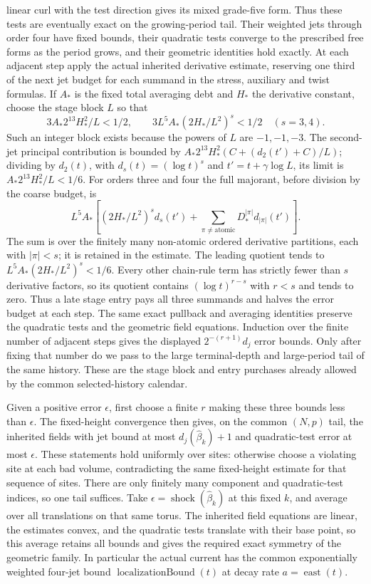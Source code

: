 linear curl with the test direction gives its mixed grade-five form.
Thus these tests are eventually exact on the growing-period tail.
Their
weighted jets through order four have fixed bounds, their
quadratic tests converge to the prescribed free forms as the period
grows, and their geometric identities hold exactly. At each adjacent
step apply the actual inherited derivative estimate, reserving one
third of the next jet budget for each summand in the stress, auxiliary
and twist formulas. If $A_*$ is the fixed total averaging debt and
$H_*$ the derivative constant, choose the stage block $L$ so that
\[
 3A_*2^{13}H_*^2/L<1/2,\qquad
 3L^5A_*(2H_*/L^2)^s<1/2\quad(s=3,4).
\]
Such an integer block exists because the powers of $L$ are $-1,-1,-3$.
The second-jet principal contribution is bounded by
$A_*2^{13}H_*^2(C+(d_2(t')+C)/L)$; dividing by $d_2(t)$,
with $d_s(t)=(\log t)^s$ and $t'=t+\gamma\log L$, its limit is
$A_*2^{13}H_*^2/L<1/6$.
For orders three and four the full majorant, before division by the
coarse budget, is
\[
 L^5A_*\left[(2H_*/L^2)^s d_s(t')+
   \sum_{\pi\ne\mathrm{atomic}}D_*^{|\pi|}d_{|\pi|}(t')\right].
\]
The sum is over the finitely many non-atomic ordered derivative
partitions, each with $|\pi|<s$; it is retained in the estimate.
The leading quotient tends to
$L^5A_*(2H_*/L^2)^s<1/6$. Every other chain-rule term has
strictly fewer than $s$ derivative factors, so its quotient contains
$(\log t)^{r-s}$ with $r<s$ and tends to zero. Thus a late stage
entry pays all three summands and halves the error budget at each
step. The same exact pullback and averaging identities preserve the
quadratic tests and the geometric field equations. Induction over the
finite number of adjacent steps gives the displayed
$2^{-(r+1)}d_j$ error bounds. Only after fixing that number do we
pass to the large terminal-depth and large-period tail of the same
history. These are the stage block and entry purchases already allowed
by the common selected-history calendar.

Given a positive error $\epsilon$, first choose a finite $r$ making
these three bounds less than $\epsilon$. The fixed-height convergence
then gives, on the common $(N,p)$ tail, the inherited fields with jet
bound at most $d_j(\widehat\beta_k)+1$ and quadratic-test error at
most $\epsilon$. These statements hold uniformly over sites: otherwise
choose a violating site at each bad volume, contradicting the same
fixed-height estimate for that sequence of sites. There are only
finitely many component and quadratic-test indices, so one tail suffices.
Take $\epsilon=\operatorname{shock}(\widehat\beta_k)$ at this fixed
$k$, and average over all translations on that same torus.
The inherited field equations are linear, the estimates convex,
and the quadratic tests translate with their base point, so this average retains all bounds
and gives the required exact symmetry of the geometric family.
In particular the actual current has the common exponentially weighted
four-jet bound $\operatorname{localizationBound}(t)$ at decay rate
$a=\operatorname{east}(t)$.

